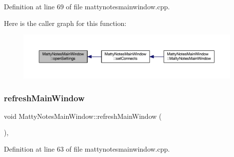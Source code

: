 Definition at line 69 of file mattynotesmainwindow.\+cpp.

Here is the caller graph for this function\+:
\nopagebreak
\begin{figure}[H]
\begin{center}
\leavevmode
\includegraphics[width=350pt]{classMattyNotesMainWindow_a174545072bf37c8b69a8447855b636f7_icgraph}
\end{center}
\end{figure}
\hypertarget{classMattyNotesMainWindow_a12025cd56092bb34c6451a92197b69a1}{}\label{classMattyNotesMainWindow_a12025cd56092bb34c6451a92197b69a1} 
\subsubsection{\texorpdfstring{refresh\+Main\+Window}{refreshMainWindow}}
{\footnotesize\ttfamily void Matty\+Notes\+Main\+Window\+::refresh\+Main\+Window (\begin{DoxyParamCaption}{ }\end{DoxyParamCaption})\hspace{0.3cm}{\ttfamily [private]}, {\ttfamily [slot]}}



Definition at line 63 of file mattynotesmainwindow.\+cpp.

